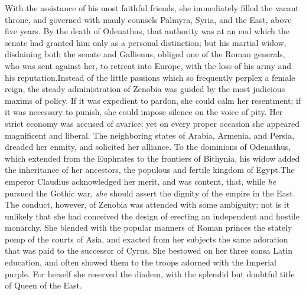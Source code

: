 With the assistance of his most faithful friends, she immediately
filled the vacant throne, and governed with manly counsels
Palmyra, Syria, and the East, above five years. By the death of
Odenathus, that authority was at an end which the senate had
granted him only as a personal distinction; but his martial
widow, disdaining both the senate and Gallienus, obliged one of
the Roman generals, who was sent against her, to retreat into
Europe, with the loss of his army and his reputation.\footnotemark[59] Instead
of the little passions which so frequently perplex a female
reign, the steady administration of Zenobia was guided by the
most judicious maxims of policy. If it was expedient to pardon,
she could calm her resentment; if it was necessary to punish, she
could impose silence on the voice of pity. Her strict economy was
accused of avarice; yet on every proper occasion she appeared
magnificent and liberal. The neighboring states of Arabia,
Armenia, and Persia, dreaded her enmity, and solicited her
alliance. To the dominions of Odenathus, which extended from the
Euphrates to the frontiers of Bithynia, his widow added the
inheritance of her ancestors, the populous and fertile kingdom of
Egypt.\footnotemark[60] The emperor Claudius acknowledged her merit, and was
content, that, while \textit{he} pursued the Gothic war, \textit{she} should
assert the dignity of the empire in the East. The conduct,
however, of Zenobia was attended with some ambiguity; not is it
unlikely that she had conceived the design of erecting an
independent and hostile monarchy. She blended with the popular
manners of Roman princes the stately pomp of the courts of Asia,
and exacted from her subjects the same adoration that was paid to
the successor of Cyrus. She bestowed on her three sons\footnotemark[61] a Latin
education, and often showed them to the troops adorned with the
Imperial purple. For herself she reserved the diadem, with the
splendid but doubtful title of Queen of the East.



